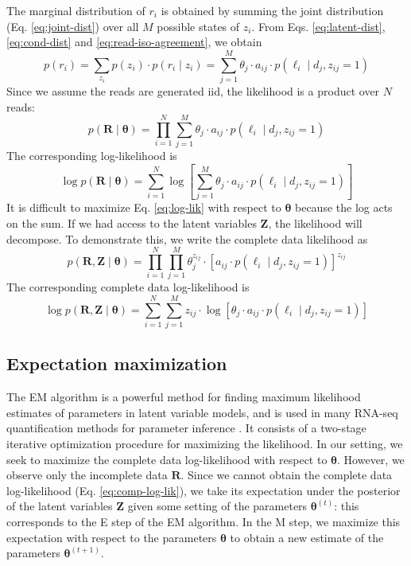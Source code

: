 The marginal distribution of $r_i$ is obtained by summing the joint distribution (Eq. \ref{eq:joint-dist}) over all $M$ possible states of $z_i$. From Eqs. \ref{eq:latent-dist}, \ref{eq:cond-dist} and \ref{eq:read-iso-agreement}, we obtain
\begin{equation}
    p(r_i)=\sum_{z_i}p(z_i)\cdot p(r_i\mid z_i)=\sum_{j=1}^M \theta_j\cdot a_{ij}\cdot p(\ell_i\mid d_j, z_{ij}=1)
\end{equation}
Since we assume the reads are generated iid, the likelihood is a product over $N$ reads:
\begin{equation}
    p(\bm{R}\mid\bm{\theta}) = \prod_{i=1}^N \sum_{j=1}^M \theta_j\cdot a_{ij}\cdot p(\ell_i\mid d_j, z_{ij}=1)\label{eq:lik}
\end{equation}
The corresponding log-likelihood is 
\begin{equation}
    \log p(\bm{R}\mid\bm{\theta}) = \sum_{i=1}^N \log \left[\sum_{j=1}^M \theta_j\cdot a_{ij}\cdot p(\ell_i\mid d_j, z_{ij}=1)\right]\label{eq:log-lik}
\end{equation}
It is difficult to maximize Eq. \ref{eq:log-lik} with respect to $\bm{\theta}$ because the log acts on the sum. If we had access to the latent variables $\bm{Z}$, the likelihood will decompose. To demonstrate this, we write the complete data likelihood as
\begin{equation}
    p(\bm{R},\bm{Z}\mid\bm{\theta})=\prod_{i=1}^N\prod_{j=1}^M \theta_j^{z_{ij}}\cdot\left[a_{ij}\cdot p(\ell_i\mid d_j, z_{ij}=1)\right]^{z_{ij}}\label{eq:comp-lik}
\end{equation}
The corresponding complete data log-likelihood is 
\begin{equation}
    \log p(\bm{R},\bm{Z}\mid\bm{\theta})=\sum_{i=1}^N\sum_{j=1}^M z_{ij}\cdot\log \left[\theta_j\cdot a_{ij}\cdot p(\ell_i\mid d_j, z_{ij}=1)\right]\label{eq:comp-log-lik}
\end{equation}

\subsection{Expectation maximization}\label{sec:em}

The EM algorithm  is a powerful method for finding maximum likelihood estimates of parameters in latent variable models, and is used in many RNA-seq quantification methods for parameter inference \cite{Li2011, Kallisto, Salmon, LIQA, Gleeson2021, Bambu2022}. It consists of a two-stage iterative optimization procedure for maximizing the likelihood. In our setting, we seek to maximize the complete data log-likelihood with respect to $\bm{\theta}$. However, we observe only the incomplete data $\bm{R}$. Since we cannot obtain the complete data log-likelihood (Eq. \ref{eq:comp-log-lik}), we take its expectation under the posterior of the latent variables $\bm{Z}$ given some setting of the parameters $\bm{\theta}^{(t)}$: this corresponds to the E step of the EM algorithm. In the M step, we maximize this expectation with respect to the parameters $\bm{\theta}$ to obtain a new estimate of the parameters $\bm{\theta}^{(t+1)}$.   

